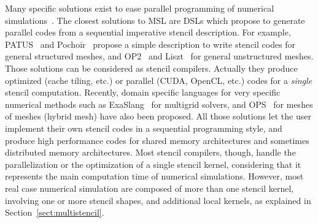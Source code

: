 
Many specific solutions exist to ease parallel programming of numerical simulations~\cite{Trilinos-Overview,petsc-efficient}. %
The closest solutions to MSL are DSLs which propose to generate parallel codes from a sequential imperative stencil description. For example, PATUS~\cite{citeulike12258902} and Pochoir~\cite{spaaTangCKLL11} propose a simple description to write stencil codes for general structured meshes, and OP2~\cite{Giles2011} and Liszt~\cite{DeVito2011LDS} for general unstructured meshes. Those solutions can be considered as stencil compilers. Actually they produce optimized (cache tiling, etc.) or parallel (CUDA, OpenCL, etc.) codes for a \emph{single} stencil computation.
Recently, domain specific languages for very specific numerical methods such as ExaSlang~\cite{Schmitt:2014:EDL:2691166.2691171} for multigrid solvers, and OPS~\cite{Reguly:2014:ODS:2691166.2691173} for meshes of meshes (hybrid mesh) have also been proposed. 
All those solutions let the user implement their own stencil codes in a sequential programming style, and produce high performance codes for shared memory architectures and sometimes distributed memory architectures. 
Most stencil compilers, though, handle the parallelization or the optimization of a single stencil kernel, considering that it represents the main computation time of numerical simulations. However, most real case numerical simulation are composed of more than one stencil kernel, involving one or more stencil shapes, and additional local kernels, as explained in Section~\ref{sect:multistencil}.

